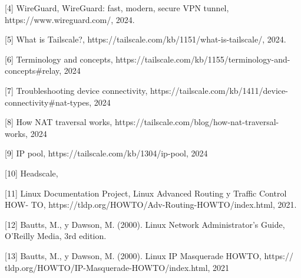 \documentclass{article}
\begin{document}
[4] WireGuard, WireGuard: fast, modern, secure VPN tunnel, https://www.wireguard.com/, 2024.

[5] What is Tailscale?, https://tailscale.com/kb/1151/what-is-tailscale/, 2024.

[6] Terminology and concepts, https://tailscale.com/kb/1155/terminology-and-concepts\#relay, 2024

[7] Troubleshooting device connectivity, https://tailscale.com/kb/1411/device-connectivity\#nat-types, 2024

[8] How NAT traversal works, https://tailscale.com/blog/how-nat-traversal-works, 2024

[9] IP pool, https://tailscale.com/kb/1304/ip-pool, 2024

[10] Headscale, 

[11] Linux Documentation Project, Linux Advanced Routing y Traffic Control HOW-
TO, https://tldp.org/HOWTO/Adv-Routing-HOWTO/index.html, 2021.  

[12] Bautts, M., y Dawson, M. (2000). Linux Network Administrator’s Guide, O’Reilly
Media, 3rd edition.

[13] Bautts, M., y Dawson, M. (2000). Linux IP Masquerade HOWTO, https://
tldp.org/HOWTO/IP-Masquerade-HOWTO/index.html, 2021
\end{document}
